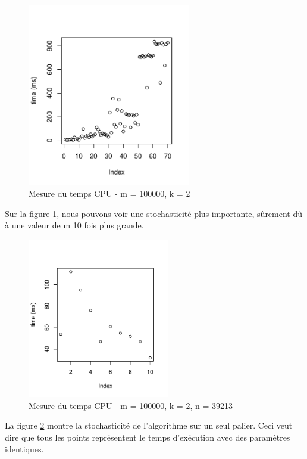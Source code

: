 \begin{figure}[H]
	\begin{center}
		\includegraphics[height=8cm]{diagrams/time_m_100000_k_2.pdf}
		\caption{Mesure du temps CPU - m = 100000, k = 2}
		\label{fig:timeM100000K2}
	\end{center}
\end{figure}
Sur la figure \ref{fig:timeM100000K2}, nous pouvons voir une stochasticité plus importante, sûrement dû à une valeur de m 10 fois plus grande.

\begin{figure}[H]
	\begin{center}
		\includegraphics[height=7cm]{diagrams/time_m_100000_k_2_n_39213.pdf}
		\caption{Mesure du temps CPU - m = 100000, k = 2, n = 39213}
		\label{fig:timeM100000K2n39213}
	\end{center}
\end{figure}
La figure \ref{fig:timeM100000K2n39213} montre la stochasticité de l'algorithme sur un seul palier. Ceci veut dire que tous les points représentent le temps d'exécution avec des paramètres identiques.

